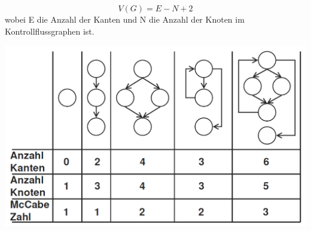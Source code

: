 \documentclass{article}
\begin{document}
\begin{enumerate}[label=\alph*)]
   \[
V(G) = E - N + 2
\]
wobei 
E die Anzahl der Kanten und 
N die Anzahl der Knoten im Kontrollflussgraphen ist.

	\includegraphics[scale=0.3]{media/McCabe.png}\\
	
\end{enumerate}
\newpage
{}
\end{document}
